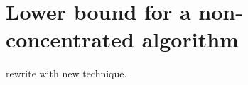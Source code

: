 \section{Lower bound for a non-concentrated algorithm}
\label{app:uniform_lb}

{\color{red} rewrite with new technique.}



